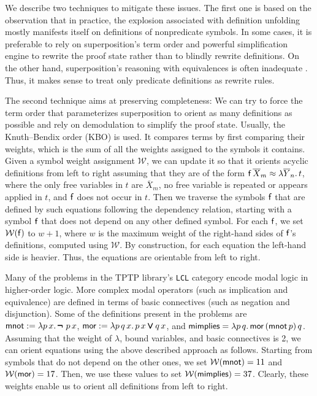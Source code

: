 \documentclass[smallcondensed,draft]{svjour3}     %
\begin{document}
We describe two techniques to mitigate these issues. The first one is based on the observation that in practice,
the explosion associated with definition unfolding mostly
manifests itself on definitions of nonpredicate symbols. In some cases, it is
preferable to rely on superposition's term order and powerful simplification
engine to rewrite the proof state rather than to blindly rewrite definitions. On
the other hand, superposition's reasoning with equivalences is often inadequate
\cite{bbtv-21-full-ho-sup, gs-05-boolsup}. Thus, it makes sense to treat only
predicate definitions as rewrite rules.

The second technique aims at preserving completeness: We can try to force the term order that
parameterizes superposition to orient as many definitions as possible and rely on
demodulation to simplify the proof state. Usually, the Knuth--Bendix order (KBO)
\cite{db-1970-kbo} is used. It compares terms by first comparing their weights,
which is the sum of all the weights assigned to the symbols it contains. Given a
symbol weight assignment $\mathcal{W}$, we can update it so that it orients
acyclic definitions from left to right assuming that they are of the form $
\mathsf{f} \, \overline{X}_m \approx \lambda \overline{Y}_n. \, t$, where the only free
variables in $t$ are $\overline{X}_m$, no free variable is repeated or appears
applied in $t$, and $\mathsf{f}$ does not occur in $t$. Then we traverse the
symbols $\mathsf{f}$ that are defined by such equations following the dependency
relation, starting with a symbol $\mathsf{f}$ that does not depend on any other
defined symbol. For each $\mathsf{f}$, we set $\mathcal{W}(\mathsf{f})$ to $w + 1$,
where $w$ is the maximum weight of the right-hand sides of $\mathsf{f}$'s
definitions, computed using $\mathcal{W}$. By construction, for each equation
the left-hand side is heavier. Thus, the equations are orientable from left to
right.



\begin{examplex} 
  Many of the problems in the TPTP library's \verb|LCL| category encode modal logic
  in higher-order logic. More complex modal operators (such as
  implication and equivalence) are defined in terms of basic connectives (such as negation
  and disjunction). Some of the definitions present in the problems are
  $\mathsf{mnot} := \lambda p\, x. \, \pmb{\neg\,} \, p \, x$, $\mathsf{mor} := \lambda p\, q\, x.
  \, p \, x \pmb\lor q \, x$,  and $\mathsf{mimplies} = \lambda p\, q. \allowbreak\, \mathsf{mor} \,
  (\mathsf{mnot} \, p) \, q$. Assuming that the weight of $\lambda$, bound
  variables, and basic connectives is 2, we can orient equations using
  the above described approach as follows. Starting from symbols that do not
  depend on the other ones, we set $\mathcal{W}(\mathsf{mnot}) = 11$ and
  $\mathcal{W}(\mathsf{mor}) = 17$. Then, we use these values to set
  $\mathcal{W}(\mathsf{mimplies}) = 37$. Clearly, these weights
  enable us to orient all definitions from left to right.
\end{examplex}
\end{document}
